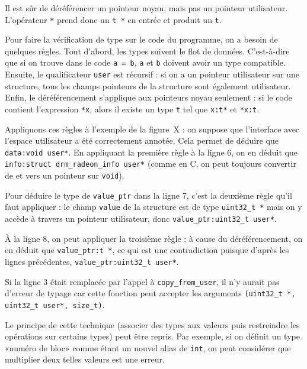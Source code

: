 Il est sûr de déréférencer un pointeur noyau, mais pas un pointeur
utilisateur. L'opérateur \texttt{*} prend donc un \texttt{t *} en entrée
et produit un \texttt{t}.

Pour faire la vérification de type sur le code du programme, on a besoin de
quelques règles. Tout d'abord, les types suivent le flot de données.
C'est-à-dire que si on trouve dans le code \texttt{a = b}, \texttt{a} et
\texttt{b} doivent avoir un type compatible. Ensuite, le qualificateur
\texttt{user} est récursif : si on a un pointeur utilisateur sur une structure,
tous les champs pointeurs de la structure sont également utilisateur. Enfin, le
déréférencement s'applique aux pointeurs noyau seulement : si le code contient
l'expression \texttt{*x}, alors il existe un type \texttt{t} tel que
\texttt{x:t*} et \texttt{*x:t}.

Appliquons ces règles à l'exemple de la figure~X : on suppose que l'interface
avec l'espace utilisateur a été correctement annotée. Cela permet de déduire que
\texttt{data:void user*}. En appliquant la première règle à la ligne 6, on en
déduit que \texttt{info:struct drm\_radeon\_info user*} (comme en C, on peut
toujours convertir de et vers un pointeur sur \texttt{void}).

Pour déduire le type de \texttt{value\_ptr} dans la ligne 7, c'est la
deuxième règle qu'il faut appliquer : le champ \texttt{value} de
la structure est de type \texttt{uint32\_t~*} mais on y accède à travers
un pointeur utilisateur, donc \texttt{value\_ptr:uint32\_t user*}.


À la ligne 8, on peut appliquer la troisième règle : à cause du déréférencement,
on en déduit que \texttt{value\_ptr:t *}, ce qui est une contradiction puisque
d'après les lignes précédentes, \texttt{value\_ptr:uint32\_t user*}.

Si la ligne 3 était remplacée par l'appel à \texttt{copy\_from\_user}, il n'y
aurait pas d'erreur de typage car cette fonction peut accepter les arguments
\texttt{(uint32\_t~*, uint32\_t user*, size\_t)}.

Le principe de cette technique (associer des types aux valeurs puis restreindre
les opérations sur certains types) peut être repris. Par exemple, si on définit
un type «numéro de bloc» comme étant un nouvel alias de \texttt{int}, on peut
considérer que multiplier deux telles valeurs est une erreur.%



